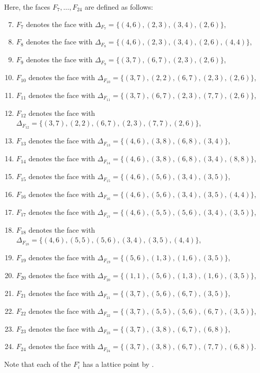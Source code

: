 \documentclass{amsart}
\theoremstyle{plain}
\theoremstyle{definition}
\numberwithin{theorem}{section}
\numberwithin{equation}{section}
\numberwithin{equation}{theorem}
\begin{document}
Here, the faces $F_7,\dots,F_{24}$ are defined as follows:

\begin{enumerate}
\setcounter{enumi}{6}
\item $F_7$ denotes the face with
$\Delta_{F_7}=\{(4,6),(2,3),(3,4),(2,6)\}$,
\item $F_8$ denotes the face with
$\Delta_{F_8}=\{(4,6),(2,3),(3,4),(2,6),(4,4)\}$,
\item $F_9$ denotes the face with
$\Delta_{F_9}=\{(3,7),(6,7),(2,3),(2,6)\}$,
\item $F_{10}$ denotes the face with
$\Delta_{F_{10}}=\{(3,7),(2,2),(6,7),(2,3),(2,6)\}$,
\item $F_{11}$ denotes the face with
$\Delta_{F_{11}}=\{(3,7),(6,7),(2,3),(7,7),(2,6)\}$,
\item $F_{12}$ denotes the face with
$\Delta_{F_{12}}=\{(3,7),(2,2),(6,7),(2,3),(7,7),(2,6)\}$,
\item $F_{13}$ denotes the face with
$\Delta_{F_{13}}=\{(4,6),(3,8),(6,8),(3,4)\}$,
\item $F_{14}$ denotes the face with
$\Delta_{F_{14}}=\{(4,6),(3,8),(6,8),(3,4),(8,8)\}$,
\item $F_{15}$ denotes the face with
$\Delta_{F_{15}}=\{(4,6),(5,6),(3,4),(3,5)\}$,
\item $F_{16}$ denotes the face with
$\Delta_{F_{16}}=\{(4,6),(5,6),(3,4),(3,5),(4,4)\}$,
\item $F_{17}$ denotes the face with
$\Delta_{F_{17}}=\{(4,6),(5,5),(5,6),(3,4),(3,5)\}$,
\item $F_{18}$ denotes the face with
$\Delta_{F_{18}}=\{(4,6),(5,5),(5,6),(3,4),(3,5),(4,4)\}$,
\item $F_{19}$ denotes the face with
$\Delta_{F_{19}}=\{(5,6),(1,3),(1,6),(3,5)\}$,
\item $F_{20}$ denotes the face with
$\Delta_{F_{20}}=\{(1,1),(5,6),(1,3),(1,6),(3,5)\}$,
\item $F_{21}$ denotes the face with
$\Delta_{F_{21}}=\{(3,7),(5,6),(6,7),(3,5)\}$,
\item $F_{22}$ denotes the face with
$\Delta_{F_{22}}=\{(3,7),(5,5),(5,6),(6,7),(3,5)\}$,
\item $F_{23}$ denotes the face with
$\Delta_{F_{23}}=\{(3,7),(3,8),(6,7),(6,8)\}$,
\item $F_{24}$ denotes the face with
$\Delta_{F_{24}}=\{(3,7),(3,8),(6,7),(7,7),(6,8)\}$.
\end{enumerate}
Note that each of the $F_i^{\circ}$ has a lattice point by \cite[Proposition 2.8]{K}. 
\end{document}
